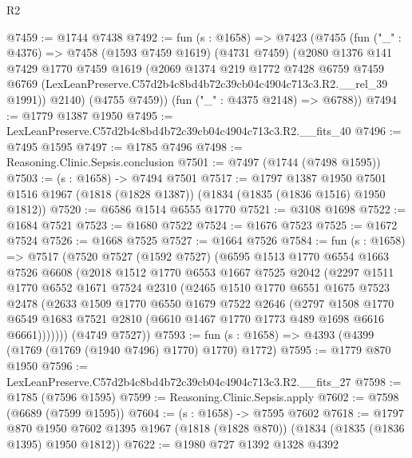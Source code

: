 \begin{lexlean}{R2}
\begin{coremodule}
@7459 := @1744 @7438
@7492 := fun (s : @1658) =>
  @7423
    (@7455
      (fun ("_" : @4376) =>
      @7458
        (@1593 @7459 @1619)
        (@4731 @7459)
        (@2080
          @1376
          @141
          @7429
          @1770
          @7459
          @1619
          (@2069
            @1374
            @219
            @1772
            @7428
            @6759
            @7459
            @6769
            (LexLeanPreserve.C57d2b4c8bd4b72c39cb04c4904c713c3.R2.__rel_39 @1991))
          @2140)
        (@4755 @7459))
      (fun ("_" : @4375 @2148) => @6788))
@7494 := @1779 @1387 @1950
@7495 := LexLeanPreserve.C57d2b4c8bd4b72c39cb04c4904c713c3.R2.__fits_40
@7496 := @7495 @1595
@7497 := @1785 @7496
@7498 := Reasoning.Clinic.Sepsis.conclusion
@7501 := @7497 (@1744 (@7498 @1595))
@7503 := (s : @1658) -> @7494 @7501
@7517 := @1797
    @1387
    @1950
    @7501
    @1516
    @1967
    (@1818 (@1828 @1387))
    (@1834 (@1835 (@1836 @1516) @1950 @1812))
@7520 := @6586 @1514 @6555 @1770
@7521 := @3108 @1698
@7522 := @1684 @7521
@7523 := @1680 @7522
@7524 := @1676 @7523
@7525 := @1672 @7524
@7526 := @1668 @7525
@7527 := @1664 @7526
@7584 := fun (s : @1658) =>
  @7517
    (@7520
      @7527
      (@1592 @7527)
      (@6595
        @1513
        @1770
        @6554
        @1663
        @7526
        @6608
        (@2018
          @1512
          @1770
          @6553
          @1667
          @7525
          @2042
          (@2297
            @1511
            @1770
            @6552
            @1671
            @7524
            @2310
            (@2465
              @1510
              @1770
              @6551
              @1675
              @7523
              @2478
              (@2633
                @1509
                @1770
                @6550
                @1679
                @7522
                @2646
                (@2797
                  @1508
                  @1770
                  @6549
                  @1683
                  @7521
                  @2810
                  (@6610 @1467 @1770 @1773 @489 @1698 @6616 @6661)))))))
      (@4749 @7527))
@7593 := fun (s : @1658) => @4393 (@4399 (@1769 (@1769 (@1940 @7496) @1770) @1770) @1772)
@7595 := @1779 @870 @1950
@7596 := LexLeanPreserve.C57d2b4c8bd4b72c39cb04c4904c713c3.R2.__fits_27
@7598 := @1785 (@7596 @1595)
@7599 := Reasoning.Clinic.Sepsis.apply
@7602 := @7598 (@6689 (@7599 @1595))
@7604 := (s : @1658) -> @7595 @7602
@7618 := @1797
    @870
    @1950
    @7602
    @1395
    @1967
    (@1818 (@1828 @870))
    (@1834 (@1835 (@1836 @1395) @1950 @1812))
@7622 := @1980 @727 @1392 @1328 @4392

\end{coremodule}
\end{lexlean}
